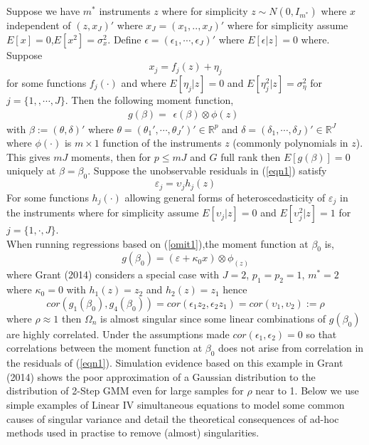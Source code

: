 \documentclass[11pt, fleqn]{article}
\begin{document}
 Suppose we have $m^*$ instruments $z$ where for simplicity $z\sim N(0,I_{m^*})$ where $x$ independent of $(z,x_J)'$ where $x_J=(x_1,..,x_{J})'$ where for simplicity assume $E[x]=0$,$E[x^2]=\sigma^2_x$.  Define $\epsilon=(\epsilon_1,\cdots,\epsilon_J)'$ where $E[\epsilon|z]=0$ where. Suppose
\begin{equation} x_j=f_j(z)+\eta_j\end{equation}
for some functions $f_j(\cdot)$ and where $E[\eta_j|z]=0$ and $E[\eta_j^2|z]=\sigma^2_{\eta}$ for $j=\{1,,\cdots,J\}$.
Then the following moment function,
\begin{equation} g(\beta)=\begin{array}{c} \epsilon(\beta) \otimes \phi(z)\end{array} \end{equation}
with $\beta:=(\theta,\delta)'$ where $\theta=(\theta_1',\cdots,\theta_J')'\in\mathbb{R}^{p}$ and $ \delta=(\delta_1,\cdots,\delta_J)'\in \mathbb{R}^J$
 where $\phi(\cdot)$ is $m\times 1$ function of the instruments $z$ (commonly polynomials in $z$). This gives $mJ$ moments, then for $p\leq mJ$ and $G$ full rank then $E[g(\beta)]=0$  uniquely at $\beta=\beta_0$.
Suppose the unobservable residuals in (\ref{eqn1})  satisfy
\begin{equation}
\varepsilon_j=\upsilon_j h_j(z) \end{equation}
For some functions $h_j(\cdot)$  allowing general forms of heteroscedasticity of $\varepsilon_j$ in the instruments where for simplicity assume $E[\upsilon_j|z]=0$ and $E[\upsilon_j^2|z]=1$ for $j=\{1,\cdot,J\}$.\\
 When running regressions based on (\ref{omit1}),the moment function at $\beta_0$ is,
 \begin{equation} g(\beta_0)=\left(\varepsilon+\kappa_0x \right)\otimes \phi_(z)\end{equation}
 where Grant (2014) considers a special case with $J=2$, $p_1=p_2=1$, $m^*=2$  where $ \kappa_0=0$ with $h_1(z)=z_2$ and $h_2(z)=z_1$ hence
 \begin{equation} cor(g_1(\beta_0),g_4(\beta_0))=cor(\epsilon_1z_2, \epsilon_2 z_1)=cor(\upsilon_1,\upsilon_2):=\rho\end{equation}
  where $ \rho \approx 1$ then $\Omega_n$ is almost singular since some linear combinations of $g(\beta_0)$ are highly correlated. Under the assumptions made $cor(\epsilon_1,\epsilon_2)=0$ so that correlations between the moment function at $\beta_0$ does not arise from correlation in the residuals of (\ref{eqn1}). Simulation evidence  based on this example in Grant (2014) shows the poor approximation of a Gaussian distribution to the distribution of 2-Step GMM even for large samples for $\rho$ near to 1. Below we use simple examples of Linear IV simultaneous equations to model some common causes of singular variance and detail the theoretical consequences of  ad-hoc methods used in practise to remove (almost) singularities. \\
\end{document}
